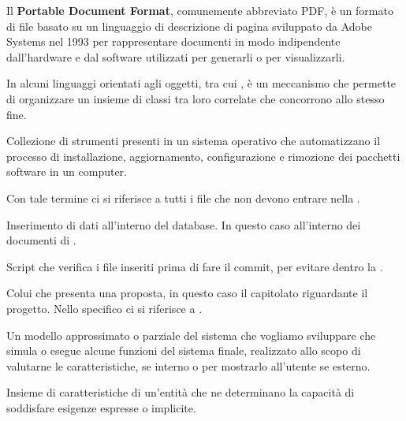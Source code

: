 \begin{itemize}


Il \textbf{Portable Document Format}, comunemente abbreviato PDF, è un formato di file basato su un linguaggio di descrizione di pagina sviluppato da Adobe Systems nel 1993 per rappresentare documenti in modo indipendente dall'hardware e dal software utilizzati per generarli o per visualizzarli. 


In alcuni linguaggi orientati agli oggetti, tra cui , è un meccanismo che permette di organizzare un insieme di classi tra loro correlate che concorrono allo stesso fine.


Collezione di strumenti presenti in un sistema operativo che automatizzano il processo di installazione, aggiornamento, configurazione e rimozione dei pacchetti software in un computer.


Con tale termine ci si riferisce a tutti i file che non devono entrare nella .


Inserimento di dati all'interno del database. In questo caso all'interno dei documenti di .


Script che verifica i file inseriti prima di fare il commit, per evitare  dentro la .


Colui che presenta una proposta, in questo caso il capitolato riguardante il progetto.
Nello specifico ci si riferisce a \Proponente{}.


Un modello approssimato o parziale del sistema che vogliamo sviluppare che simula o esegue alcune funzioni del sistema finale, realizzato allo scopo di valutarne le caratteristiche, se interno o per mostrarlo all'utente se esterno.

\end{itemize}


\begin{itemize}


Insieme di caratteristiche di un'entità che ne determinano la capacità di soddisfare esigenze espresse o implicite.

\end{itemize}

